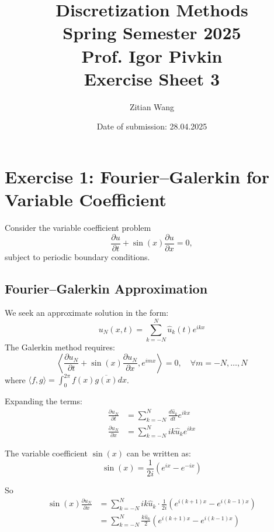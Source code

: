 \documentclass[11pt]{article}
\title{Discretization Methods\\Spring Semester 2025\\Prof. Igor Pivkin\\[1ex]Exercise Sheet 3}
\date{Date of submission: 28.04.2025}
\author{Zitian Wang}
\begin{document}
\maketitle



\section*{Exercise 1: Fourier--Galerkin for Variable Coefficient}
Consider the variable coefficient problem
\begin{equation}
\frac{\partial u}{\partial t} + \sin(x) \frac{\partial u}{\partial x} = 0,
\end{equation}
subject to periodic boundary conditions.

\subsection*{Fourier--Galerkin Approximation}
We seek an approximate solution in the form:
\begin{equation}
    u_N(x, t) = \sum_{k=-N}^N \hat{u}_k(t) e^{ikx}
\end{equation}
The Galerkin method requires:
\begin{equation}
    \left\langle \frac{\partial u_N}{\partial t} + \sin(x) \frac{\partial u_N}{\partial x}, e^{i m x} \right\rangle = 0, \quad \forall m = -N,\ldots,N
\end{equation}
where $\langle f, g \rangle = \int_0^{2\pi} f(x) \overline{g(x)} dx$.

Expanding the terms:
\begin{align*}
    \frac{\partial u_N}{\partial t} &= \sum_{k=-N}^N \frac{d\hat{u}_k}{dt} e^{ikx} \\
    \frac{\partial u_N}{\partial x} &= \sum_{k=-N}^N i k \hat{u}_k e^{ikx}
\end{align*}

The variable coefficient $\sin(x)$ can be written as:
\begin{equation}
    \sin(x) = \frac{1}{2i}(e^{ix} - e^{-ix})
\end{equation}

So
\begin{align*}
    \sin(x) \frac{\partial u_N}{\partial x} &= \sum_{k=-N}^N i k \hat{u}_k \cdot \frac{1}{2i}(e^{i(k+1)x} - e^{i(k-1)x}) \\
    &= \sum_{k=-N}^N \frac{k \hat{u}_k}{2} (e^{i(k+1)x} - e^{i(k-1)x})
\end{align*}
\end{document}

